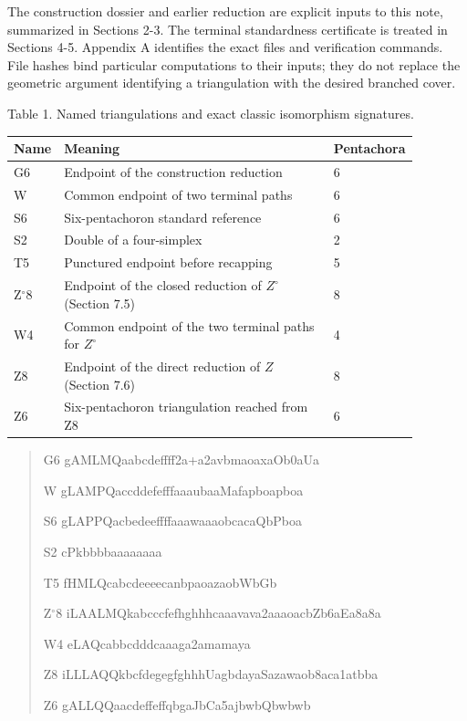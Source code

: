 \documentclass[11pt,letterpaper]{article}
\begin{document}
The construction dossier and earlier reduction are explicit inputs to this note, summarized in Sections 2-3. The terminal standardness certificate is treated in Sections 4-5. Appendix A identifies the exact files and verification commands. File hashes bind particular computations to their inputs; they do not replace the geometric argument identifying a triangulation with the desired branched cover.

\noindent\begin{minipage}{\linewidth}
\begin{center}\small
Table 1. Named triangulations and exact classic isomorphism signatures.\par\smallskip
\begin{tabular}{p{0.08\linewidth}p{0.67\linewidth}p{0.13\linewidth}}
\toprule
\textbf{Name} & \textbf{Meaning} & \textbf{Pentachora} \\
\midrule
G6 & Endpoint of the construction reduction & 6 \\
W & Common endpoint of two terminal paths & 6 \\
S6 & Six-pentachoron standard reference & 6 \\
S2 & Double of a four-simplex & 2 \\
T5 & Punctured endpoint before recapping & 5 \\
Z$^\circ$8 & Endpoint of the closed reduction of $Z^\circ$ (Section 7.5) & 8 \\
W4 & Common endpoint of the two terminal paths for $Z^\circ$ & 4 \\
Z8 & Endpoint of the direct reduction of $Z$ (Section 7.6) & 8 \\
Z6 & Six-pentachoron triangulation reached from Z8 & 6 \\
\bottomrule
\end{tabular}
\end{center}
\begin{quote}\small\ttfamily
G6  gAMLMQaabcdeffff2a+a2avbmaoaxaOb0aUa\par
W  gLAMPQaccddefefffaaaubaaMafapboapboa\par
S6  gLAPPQacbedeeffffaaawaaaobcacaQbPboa\par
S2  cPkbbbbaaaaaaaa\par
T5  fHMLQcabcdeeeecanbpaoazaobWbGb\par
Z$^\circ$8 iLAALMQkabcccfefhghhhcaaavava2aaaoacbZb6aEa8a8a\par
W4  eLAQcabbcdddcaaaga2amamaya\par
Z8  iLLLAQQkbcfdegegfghhhUagbdayaSazawaob8aca1atbba\par
Z6  gALLQQaacdeffeffqbgaJbCa5ajbwbQbwbwb\par
\end{quote}
\end{minipage}\par\smallskip
\end{document}

